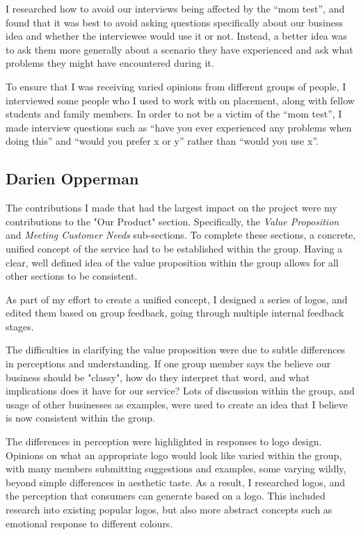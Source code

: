 \documentclass[10pt,a4paper]{article}
\begin{document}
\begin{appendices}
I researched how to avoid our interviews being affected by the ``mom test'', and found that it was best to avoid asking questions specifically about our business idea and whether the interviewee would use it or not. Instead, a better idea was to ask them more generally about a scenario they have experienced and ask what problems they might have encountered during it.

To ensure that I was receiving varied opinions from different groups of people, I interviewed some people who I used to work with on placement, along with fellow students and family members. In order to not be a victim of the ``mom test'', I made interview questions such as ``have you ever experienced any problems when doing this'' and ``would you prefer x or y'' rather than ``would you use x''.

\clearpage
\subsection{Darien Opperman}\label{subsec:darienOpperman}
The contributions I made that had the largest impact on the project were my contributions to the "Our Product" section. Specifically, the \textit{Value Proposition} and \textit{Meeting Customer Needs} sub-sections. To complete these sections, a concrete, unified concept of the service had to be established within the group. Having a clear, well defined idea of the value proposition within the group allows for all other sections to be consistent.

As part of my effort to create a unified concept, I designed a series of logos, and edited them based on group feedback, going through multiple internal feedback stages.

The difficulties in clarifying the value proposition were due to subtle differences in perceptions and understanding. If one group member says the believe our business should be "classy", how do they interpret that word, and what implications does it have for our service? Lots of discussion within the group, and usage of other businesses as examples, were used to create an idea that I believe is now consistent within the group.

The differences in perception were highlighted in responses to logo design. Opinions on what an appropriate logo would look like varied within the group, with many members submitting suggestions and examples, some varying wildly, beyond simple differences in aesthetic taste. As a result, I researched logos, and the perception that consumers can generate based on a logo. This included research into existing popular logos, but also more abstract concepts such as emotional response to different colours.


\end{appendices}
\end{document}
